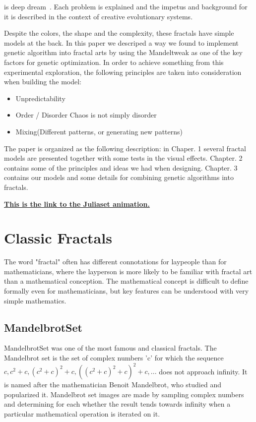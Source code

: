 \documentclass[fleqn,10pt]{SelfArx} %
\begin{document}
is deep dream~\cite{deep_dreams}.
Each problem is explained and the impetus and background for it is described
in the context of creative evolutionary systems.




Despite the colors, the shape and the complexity, these fractals have simple models at the back. In this paper we descriped a way we found to implement genetic
algorithm into fractal arts by using the Mandeltweak as one of the key
factors for genetic optimization.
 In order to achieve something from this experimental exploration, the following principles are taken into consideration when building the model:

\begin{itemize}
\item Unpredictability
\item Order / Disorder Chaos is not simply disorder
\item Mixing(Different patterns, or generating new patterns)
\end{itemize}

The paper is organized as the following description: in Chaper. 1 several fractal models are presented together with some tests in the visual effects. Chapter. 2 contains some of the principles and ideas we had when designing.
 Chapter. 3  contains our models and some details for combining genetic algorithms into fractals.


\href{http://giphy.com/gifs/l41lUTY3yTLywvYRO?utm_source=facebook&utm_medium=embed&utm_campaign=share}{\bf This is the link to the Juliaset animation.}

\section{Classic Fractals}
The word "fractal" often has different connotations for laypeople than for mathematicians, where the layperson is more likely to be familiar with fractal art than a mathematical conception. The mathematical concept is difficult to define formally even for mathematicians, but key features can be understood with very simple mathematics.

\subsection{MandelbrotSet}
MandelbrotSet was one of the most famous and classical fractals. The
Mandelbrot set is the set of complex numbers 'c' for which the
sequence {$c, c^2+c, (c^2+c)^2+c, ((c^2+c)^2+c)^2+c, ...$} does not
approach infinity. It is named after the mathematician Benoit
Mandelbrot, who studied and popularized it. Mandelbrot set images are
made by sampling complex numbers and determining for each whether the
result tends towards infinity when a particular mathematical operation
is iterated on it.
\end{document}
